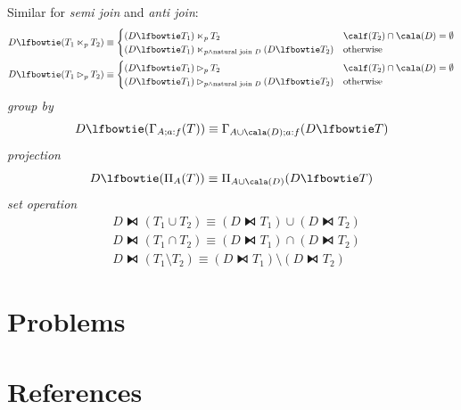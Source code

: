 \documentclass[11pt]{article}
\begin{document}
Similar for \emph{semi join} and \emph{anti join}:
\begin{align*}
&D\lfbowtie(T_1\ltimes_pT_2)\equiv
\begin{cases}
(D\lfbowtie T_1)\ltimes_pT_2&\calf(T_2)\cap\cala(D)=\emptyset\\
(D\lfbowtie T_1)\ltimes_{p\wedge\text{natural join }D}(D\lfbowtie T_2)&\text{otherwise}
\end{cases}\\
&D\lfbowtie(T_1\rhd_pT_2)\equiv
\begin{cases}
(D\lfbowtie T_1)\rhd_pT_2&\calf(T_2)\cap\cala(D)=\emptyset\\
(D\lfbowtie T_1)\rhd_{p\wedge\text{natural join }D}(D\lfbowtie T_2)&\text{otherwise}
\end{cases}
\end{align*}
\emph{group by}
\begin{equation*}
D\lfbowtie(\Gamma_{A;a:f}(T))\equiv\Gamma_{A\cup\cala(D);a:f}(D\lfbowtie T)
\end{equation*}
\emph{projection}
\begin{equation*}
D\lfbowtie(\Pi_A(T))\equiv\Pi_{A\cup\cala(D)}(D\lfbowtie T)
\end{equation*}
\emph{set operation}
\begin{align*}
&D\lfbowtie(T_1\cup T_2)\equiv(D\lfbowtie T_1)\cup(D\lfbowtie T_2)\\
&D\lfbowtie(T_1\cap T_2)\equiv(D\lfbowtie T_1)\cap(D\lfbowtie T_2)\\
&D\lfbowtie(T_1\setminus T_2)\equiv(D\lfbowtie T_1)\setminus(D\lfbowtie T_2)
\end{align*}
\section{Problems}
\label{sec:org9823ec5}


\section{References}
\label{sec:org921ab80}
\label{bibliographystyle link}


\label{bibliography link}

\end{document}
